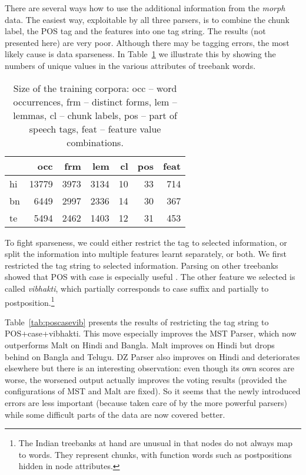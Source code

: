 \documentclass[11pt]{article}
\def\Tref#1{Table~\ref{#1}}
\begin{document}
There are several ways how to use the additional information from the \textit{morph} data. The easiest way, exploitable by all three parsers, is to combine the chunk label, the POS tag and the features into one tag string. The results (not presented here) are very poor. Although there may be tagging errors, the most likely cause is data sparseness. In \Tref{tab:corpus} we illustrate this by showing the numbers of unique values in the various attributes of treebank words.

\begin{table}[ht]
\begin{centering}
\begin{tabular}{l|r|r|r|r|r|r}
& \textbf{occ} & \textbf{frm} & \textbf{lem} & \textbf{cl} & \textbf{pos} & \textbf{feat} \\
\hline
hi & 13779 & 3973 & 3134 & 10 & 33 & 714\\
bn & 6449 & 2997 & 2336 & 14 & 30 & 367\\
te & 5494 & 2462 & 1403 & 12 & 31 & 453\\
\end{tabular}
\caption{Size of the training corpora: occ -- word occurrences, frm -- distinct forms, lem -- lemmas, cl -- chunk labels, pos -- part of speech tags, feat -- feature value combinations.}
\label{tab:corpus}
\end{centering}
\end{table}

To fight sparseness, we could either restrict the tag to selected information, or split the information into multiple features learnt separately, or both. We first restricted the tag string to selected information. Parsing on other treebanks showed that POS with case is especially useful \citep{dzparser}. The other feature we selected is called \textit{vibhakti}, which partially corresponds to case suffix and partially to postposition.\footnote{The Indian treebanks at hand are unusual in that nodes do not always map to words. They represent chunks, with function words such as postpositions hidden in node attributes.}

\Tref{tab:poscasevib} presents the results of restricting the tag string to POS+case+vibhakti. This move especially improves the MST Parser, which now outperforms Malt on Hindi and Bangla. Malt improves on Hindi but drops behind on Bangla and Telugu. DZ Parser also improves on Hindi and deteriorates elsewhere but there is an interesting observation: even though its own scores are worse, the worsened output actually improves the voting results (provided the configurations of MST and Malt are fixed). So it seems that the newly introduced errors are less important (because taken care of by the more powerful parsers) while some difficult parts of the data are now covered better.
\end{document}
